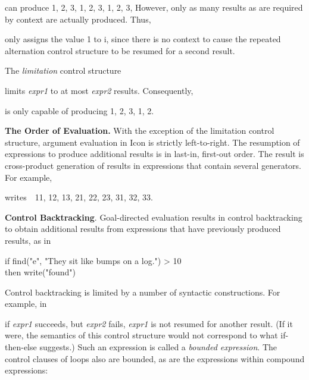 
\noindent can produce 1, 2, 3, 1, 2, 3, 1, 2, 3, However, only as
many results as are required by context are actually produced. Thus,


\noindent only assigns the value 1 to i, since there is no context to
cause the repeated alternation control structure to be resumed for a
second result.

The \textit{limitation} control structure


\noindent
limits \textit{expr1 }to at most \textit{expr2 }results. Consequently,


\noindent
is only capable of producing 1, 2, 3, 1, 2.

\textbf{The Order of Evaluation.} With the exception of the limitation
control structure, argument evaluation in Icon is strictly
left-to-right. The resumption of expressions to produce additional
results is in last-in, first-out order. The result is
{\textquotedbl}cross-product{\textquotedbl} generation of results in
expressions that contain several generators. For example,


\noindent
writes\ \ 11, 12, 13, 21, 22, 23, 31, 32, 33.


\textbf{Control Backtracking}. Goal-directed evaluation results in
control backtracking to obtain additional results from expressions
that have previously produced results, as in

\begin{iconcode}
\>if find("e", "They sit like bumps on a log.") > 10\\
\>then write("found")
\end{iconcode}

Control backtracking is limited by a number of syntactic
constructions. For example, in


\noindent if \textit{expr1} succeeds, but \textit{expr2} fails,
\textit{expr1} is not resumed for another result. (If it were, the
semantics of this control structure would not correspond to what
{\textquotedbl}if-then-else{\textquotedbl} suggests.)  Such an
expression is called a \textit{bounded expression}. The control
clauses of loops also are bounded, as are the expressions within
compound expressions:

